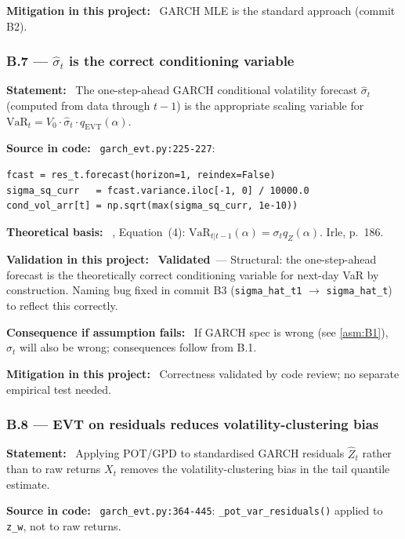 \documentclass[11pt,a4paper]{article}
\newcommand{\asmfield}[1]{\medskip\noindent\textbf{#1:}\ }
\newcommand{\code}[1]{\texttt{#1}}
\newcommand{\validated}{\textbf{Validated}}
\begin{document}
\asmfield{Mitigation in this project}
GARCH MLE is the standard approach (commit B2).

\subsubsection{B.7 --- $\hat{\sigma}_t$ is the correct conditioning variable}\label{asm:B7}

\asmfield{Statement}
The one-step-ahead GARCH conditional volatility forecast $\hat{\sigma}_t$
(computed from data through $t-1$) is the appropriate scaling variable for
$\text{VaR}_t = V_0 \cdot \hat{\sigma}_t \cdot q_{\mathrm{EVT}}(\alpha)$.

\asmfield{Source in code}
\code{garch\_evt.py:225-227}:
\begin{lstlisting}
fcast = res_t.forecast(horizon=1, reindex=False)
sigma_sq_curr   = fcast.variance.iloc[-1, 0] / 10000.0
cond_vol_arr[t] = np.sqrt(max(sigma_sq_curr, 1e-10))
\end{lstlisting}

\asmfield{Theoretical basis}
\cite{McNeilFrey2000}, Equation~(4): $\text{VaR}_{t|t-1}(\alpha) =
\sigma_t q_Z(\alpha)$. Irle, p.~186.

\asmfield{Validation in this project}
\validated\ --- Structural: the one-step-ahead forecast is the theoretically
correct conditioning variable for next-day VaR by construction. Naming bug
fixed in commit B3 (\code{sigma\_hat\_t1} $\to$ \code{sigma\_hat\_t}) to
reflect this correctly.

\asmfield{Consequence if assumption fails}
If GARCH spec is wrong (see \cref{asm:B1}), $\hat{\sigma}_t$ will also
be wrong; consequences follow from B.1.

\asmfield{Mitigation in this project}
Correctness validated by code review; no separate empirical test needed.

\subsubsection{B.8 --- EVT on residuals reduces volatility-clustering bias}\label{asm:B8}

\asmfield{Statement}
Applying POT/GPD to standardised GARCH residuals $\hat{Z}_t$ rather than
to raw returns $X_t$ removes the volatility-clustering bias in the tail
quantile estimate.

\asmfield{Source in code}
\code{garch\_evt.py:364-445}: \code{\_pot\_var\_residuals()} applied to
\code{z\_w}, not to raw returns.
\end{document}
